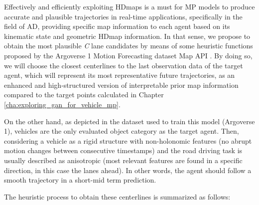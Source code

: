 Effectively and efficiently exploiting \acp{HDmap} is a must for \ac{MP} models to produce accurate and plausible trajectories in real-time applications, specifically in the field of \ac{AD}, providing specific map information to each agent based on its kinematic state and geometric \ac{HDmap} information. In that sense, we propose to obtain the most plausible \textit{C} lane candidates by means of some heuristic functions proposed by the Argoverse 1 Motion Forecasting dataset Map \ac{API} \cite{chang2019argoverse, khandelwal2020if}. By doing so, we will choose the closest centerlines to the last observation data of the target agent, which will represent its most representative future trajectories, as an enhanced and high-structured version of interpretable prior map information compared to the target points calculated in Chapter \ref{cha:exploring_gan_for_vehicle_mp}.

On the other hand, as depicted in the dataset used to train this model (Argoverse 1), vehicles are the only evaluated object category as the target agent. Then, considering a vehicle as a rigid structure with non-holonomic \cite{triggs1993motion} features (no abrupt motion changes between consecutive timestamps) and the road driving task is usually described as anisotropic \cite{ross1989planning} (most relevant features are found in a specific direction, in this case the lanes ahead). In other words, the agent should follow a smooth trajectory in a short-mid term prediction. 

The heuristic process to obtain these centerlines is summarized as follows:

